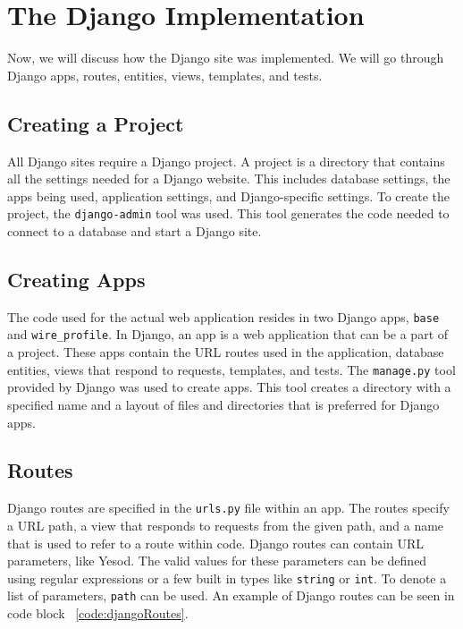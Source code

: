 \section{The Django Implementation}
Now, we will discuss how the Django site was implemented. We will go through Django apps,
routes, entities, views, templates, and tests.

\subsection{Creating a Project}
All Django sites require a Django project. A project is
a directory that contains all the settings needed for a Django website. This includes
database settings, the apps being used, application settings, and Django-specific
settings. To create the project, the \texttt{django-admin} tool was used. This tool
generates the code needed to connect to a database and start a Django site. \parencite{djangoIntroDocs}

\subsection{Creating Apps}

The code used for the actual web application resides in two Django apps, \texttt{base} and
\texttt{wire\_profile}. In Django, an app is a web application that can be a part of a project.
These apps contain the URL routes used in the application, database entities, views
that respond to requests, templates, and tests. The \texttt{manage.py} tool provided
by Django was used to create apps. This tool creates a directory with a specified name
and a layout of files and directories that is preferred for Django apps. \parencite{djangoIntroDocs}

\subsection{Routes}

Django routes are specified in the \texttt{urls.py} file within an app. The routes
specify a URL path, a view that responds to requests from the given path, and a name
that is used to refer to a route within code. Django routes can contain URL parameters,
like Yesod. The valid values for these parameters can be defined using regular expressions
or a few built in types like \texttt{string} or \texttt{int}. To denote a list of parameters,
\texttt{path} can be used. An example of Django routes can be seen in code block ~\ref{code:djangoRoutes}.

